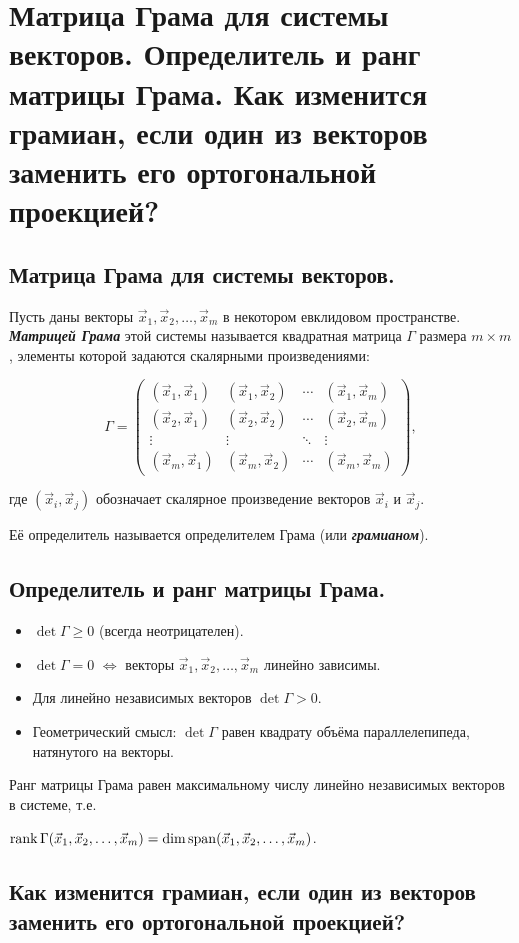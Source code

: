 \section{
    Матрица Грама для системы векторов. Определитель и ранг матрицы Грама. Как изменится грамиан, если один из векторов заменить его ортогональной проекцией?
}

\subsection{
    Матрица Грама для системы векторов.
}
    
\begin{definition}
    Пусть даны векторы \( \vec{x}_1, \vec{x}_2, \dots, \vec{x}_m \) в некотором евклидовом пространстве. \textit{\textbf{Матрицей Грама}} этой системы называется квадратная матрица \( \Gamma \) размера \( m \times m \), элементы которой задаются скалярными произведениями:

    \[
    \Gamma = \begin{pmatrix}
    (\vec{x}_1, \vec{x}_1) & (\vec{x}_1, \vec{x}_2) & \cdots & (\vec{x}_1, \vec{x}_m) \\
    (\vec{x}_2, \vec{x}_1) & (\vec{x}_2, \vec{x}_2) & \cdots & (\vec{x}_2, \vec{x}_m) \\
    \vdots     & \vdots     & \ddots & \vdots     \\
    (\vec{x}_m, \vec{x}_1) & (\vec{x}_m, \vec{x}_2) & \cdots & (\vec{x}_m, \vec{x}_m)
    \end{pmatrix},
    \]
    
    где \( (\vec{x}_i, \vec{x}_j) \) обозначает скалярное произведение векторов \( \vec{x}_i \) и \( \vec{x}_j \).
\end{definition}

Её определитель называется определителем Грама (или \textbf{\textit{грамианом}}).


\subsection{
    Определитель и ранг матрицы Грама.
}


\begin{itemize}
\item $\det \Gamma \geq 0$ (всегда неотрицателен).
\item $\det \Gamma = 0$ $\iff$ векторы $\vec{x}_1, \vec{x}_2, \dots, \vec{x}_m$ линейно зависимы.
\item Для линейно независимых векторов $\det \Gamma > 0$.
\item Геометрический смысл: $\det \Gamma$ равен квадрату объёма параллелепипеда, натянутого на векторы.
\end{itemize}

Ранг матрицы Грама равен максимальному числу линейно независимых векторов в системе, т.е. 

$\operatorname{\mathop{\mathrm{rank}}} \Gamma(\vec{x}_1, \vec{x}_2, \dots, \vec{x}_m) = \dim \operatorname{\mathop{\mathrm{span}}} (\vec{x}_1, \vec{x}_2, \dots, \vec{x}_m)$.


\subsection{
    Как изменится грамиан, если один из векторов заменить его ортогональной проекцией?
}
